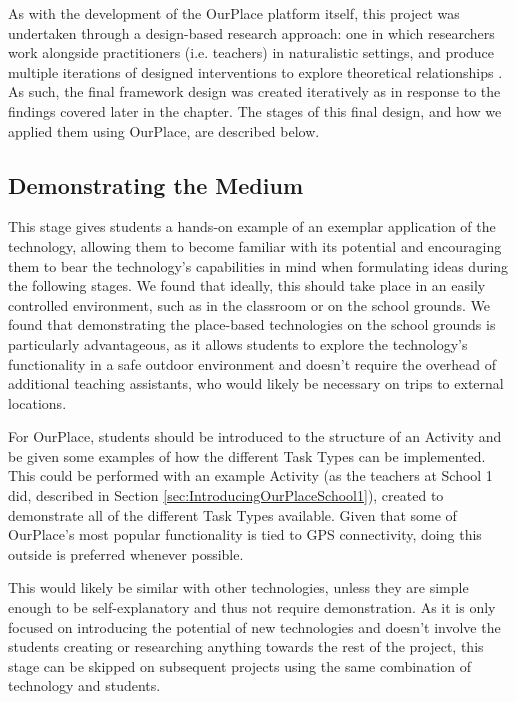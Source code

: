 As with the development of the OurPlace platform itself, this project was undertaken through a design-based research approach: one in which researchers work alongside practitioners (i.e. teachers) in naturalistic settings, and produce multiple iterations of designed interventions to explore theoretical relationships \cite{Barab2004}. As such, the final framework design was created iteratively as in response to the findings covered later in the chapter. The stages of this final design, and how we applied them using OurPlace, are described below.

\subsection{Demonstrating the Medium}
This stage gives students a hands-on example of an exemplar application of the technology, allowing them to become familiar with its potential and encouraging them to bear the technology's capabilities in mind when formulating ideas during the following stages. We found that ideally, this should take place in an easily controlled environment, such as in the classroom or on the school grounds. We found that demonstrating the place-based technologies on the school grounds is particularly advantageous, as it allows students to explore the technology's functionality in a safe outdoor environment and doesn't require the overhead of additional teaching assistants, who would likely be necessary on trips to external locations. 

For OurPlace, students should be introduced to the structure of an Activity and be given some examples of how the different Task Types can be implemented. This could be performed with an example Activity (as the teachers at School 1 did, described in Section \ref{sec:IntroducingOurPlaceSchool1}), created to demonstrate all of the different Task Types available. Given that some of OurPlace's most popular functionality is tied to GPS connectivity, doing this outside is preferred whenever possible. 

This would likely be similar with other technologies, unless they are simple enough to be self-explanatory and thus not require demonstration. As it is only focused on introducing the potential of new technologies and doesn't involve the students creating or researching anything towards the rest of the project, this stage can be skipped on subsequent projects using the same combination of technology and students.

